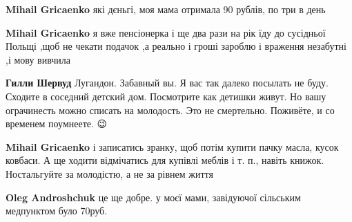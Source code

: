 \begin{itemize}
\begin{itemize}
 
\textbf{Mihail Gricaenko} які дєньгі, моя мама отримала 90 рублів, по три в день

 
\textbf{Mihail Gricaenko} я вже пенсіонерка і ще два рази на рік їду до
сусідньої Польщі ,щоб не чекати подачок ,а реально і гроші зароблю і враження
незабутні ,і мову вивчила

 
\textbf{Гилли Шервуд} Лугандон. Забавный вы. Я вас так далеко посылать не буду.
Сходите в соседний детский дом. Посмотрите как детишки живут.  Но вашу
ограчинесть можно списать на молодость. Это не смертельно. Поживёте, и со
временем поумнеете. 😉

 
\textbf{Mihail Gricaenko} і записатись зранку, щоб потім купити пачку
масла, кусок ковбаси. А ще ходити відмічатись для купівлі меблів і т. п., навіть
книжок. Ностальгуйте за молодістю, а не за рівнем життя

 
\textbf{Oleg Androshchuk} це ще добре. у моєї мами, завідуючої сільським медпунктом було 70руб.

 

\end{itemize}
\end{itemize}
